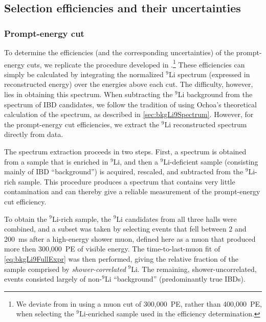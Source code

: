 \documentclass[../thesis.tex]{subfiles}
\begin{document}
\subsection{Selection efficiencies and their uncertainties}
\label{sec:bkgLi9SelEffs}

\subsubsection{Prompt-energy cut}
\label{sec:bkgLi9PromptCutEff}

To determine the efficiencies (and the corresponding uncertainties) of the prompt-energy cuts, we replicate the procedure developed in \cite{ChrisLi9}.\footnote{We deviate from \cite{ChrisLi9} in using a muon cut of 300,000~PE, rather than 400,000~PE, when selecting the $^9$Li-enriched sample used in the efficiency determination.} These efficiencies can simply be calculated by integrating the normalized $^9$Li spectrum (expressed in reconstructed energy) over the energies above each cut. The difficulty, however, lies in obtaining this spectrum. When subtracting the $^9$Li background from the spectrum of IBD candidates, we follow the tradition of using Ochoa's theoretical calculation of the spectrum, as described in \autoref{sec:bkgLi9Spectrum}. However, for the prompt-energy cut efficiencies, we extract the $^9$Li reconstructed spectrum directly from data.

The spectrum extraction proceeds in two steps. First, a spectrum is obtained from a sample that is enriched in $^9$Li, and then a $^9$Li-deficient sample (consisting mainly of IBD ``background'') is acquired, rescaled, and subtracted from the $^9$Li-rich sample. This procedure produces a spectrum that contains very little contamination and can thereby give a reliable measurement of the prompt-energy cut efficiency.

To obtain the $^9$Li-rich sample, the $^9$Li candidates from all three halls were combined, and a subset was taken by selecting events that fell between 2 and 200~ms after a high-energy shower muon, defined here as a muon that produced more then 300,000~PE of visible energy. The time-to-last-muon fit of \autoref{eq:bkgLi9FullExpr} was then performed, giving the relative fraction of the sample comprised by \emph{shower-correlated} $^9$Li. The remaining, shower-uncorrelated, events consisted largely of non-$^9$Li ``background'' (predominantly true IBDs).
\end{document}
